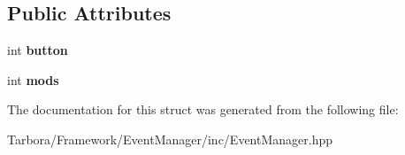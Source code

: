 \subsection*{Public Attributes}
\begin{DoxyCompactItemize}
\item 
\mbox{\label{structTarbora_1_1MouseButtonReleaseEvent_abc576a9aae46a465ccfe2f4bfcae1029}} 
int {\bfseries button}
\item 
\mbox{\label{structTarbora_1_1MouseButtonReleaseEvent_aa8d28c89d683d9418cef08821415b575}} 
int {\bfseries mods}
\end{DoxyCompactItemize}


The documentation for this struct was generated from the following file\+:\begin{DoxyCompactItemize}
\item 
Tarbora/\+Framework/\+Event\+Manager/inc/Event\+Manager.\+hpp\end{DoxyCompactItemize}
